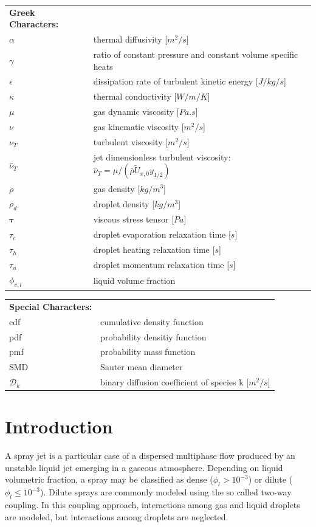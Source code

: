 \documentclass[preprint,12pt,review]{elsarticle}
\newcommand{\bv}[1]{\mathbf{#1}}
\begin{document}
\begin{tabular}{ll}
\textbf{Greek Characters:} & \\
$\alpha$ & thermal diffusivity [$m^2/s$]\\
$\gamma$ & ratio of constant pressure and constant volume specific heats \\
$\epsilon$ & dissipation rate of turbulent kinetic energy [$J/kg/s$]\\
$\kappa$ & thermal conductivity [$W/m/K$]\\
$\mu$ & gas dynamic viscosity [$Pa.s$]\\
$\nu$ & gas kinematic viscosity [$m^2 /s$]\\
$\nu_T$ &  turbulent viscosity [$m^2 /s$] \\
$\hat{\nu}_T$ &  jet dimensionless turbulent viscosity: $\hat{\nu}_T = \mu/(\bar{\rho}\tilde{U}_{x,0} y_{1/2})$\\
$\rho$ & gas density [$kg/m^3$]\\
$\rho_d$ & droplet density [$kg/m^3$]\\
$\bv{\tau}$ & viscous stress tensor [$Pa$]\\
$\tau_e$ & droplet evaporation relaxation time [$s$]\\
$\tau_h$ & droplet heating relaxation time [$s$]\\
$\tau_u$ & droplet momentum relaxation time [$s$] \\
$\phi_{v,l}$ & liquid volume fraction
\end{tabular}

\vspace{25pt}

\begin{tabular}{ll}
\textbf{Special Characters:} & \\
cdf & cumulative density function\\
pdf & probability densitiy function\\
pmf & probability mass function\\
SMD & Sauter mean diameter \\
$\mathcal{D}_k$ & binary diffusion coefficient of species k [$m^2/s$]
\end{tabular}



\section{Introduction}
\label{intro}
A spray jet is a particular case of a dispersed multiphase flow produced by an unstable liquid jet emerging in a gaseous atmosphere. 
Depending on liquid volumetric fraction, a spray may be classified as dense ($\phi_l > 10^{-3}$) or dilute ($\phi_l \le 10^{-3}$). Dilute sprays are commonly modeled using the so called two-way coupling.  In this coupling approach, interactions among gas and liquid droplets are modeled, but interactions among droplets are neglected.
\end{document}
